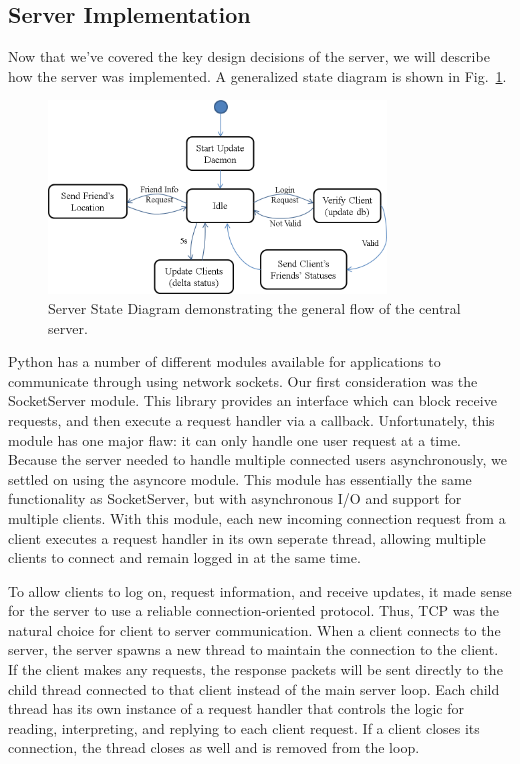 \subsection{Server Implementation}
Now that we've covered the key design decisions of the server, we will describe how the server
was implemented. A generalized state diagram is shown in Fig.~\ref{fig:server_diag}.

\begin{figure}[!t]
   \centering
      \includegraphics[width=0.8\textwidth]{pics/Server_StateDiagram}
   \caption{Server State Diagram demonstrating the general flow of the central server.}
\label{fig:server_diag}
\end{figure}


Python has a number of different modules available for applications to communicate
through using network sockets. Our first consideration was the SocketServer module. This 
library
provides an interface which can block receive requests, and then execute a request
handler via a callback. Unfortunately, this module has one major flaw: it can only handle
one user request at a time. Because the server needed to handle multiple connected users
asynchronously, we settled on using the asyncore module. This module has essentially
the same functionality as SocketServer, but with asynchronous I/O and support for multiple clients. With this module, each
new incoming connection request from a client executes a request handler in its own seperate thread, allowing 
multiple clients to connect and remain logged in at the same time.

To allow clients to log on, request information, and receive updates, it made
sense for the server to use a reliable connection-oriented protocol. Thus, TCP was the 
natural
choice for client to server communication. When a client connects to the server, the server spawns a new thread to maintain
the connection to the client. If the client makes any requests, the response packets will 
be sent
directly to the child thread connected to that client instead of the main server loop. Each child thread has its own
instance of a request handler that controls the logic for reading, interpreting, and replying
to each client request. If a client closes its connection, the thread closes as well and is
removed from the loop. 

